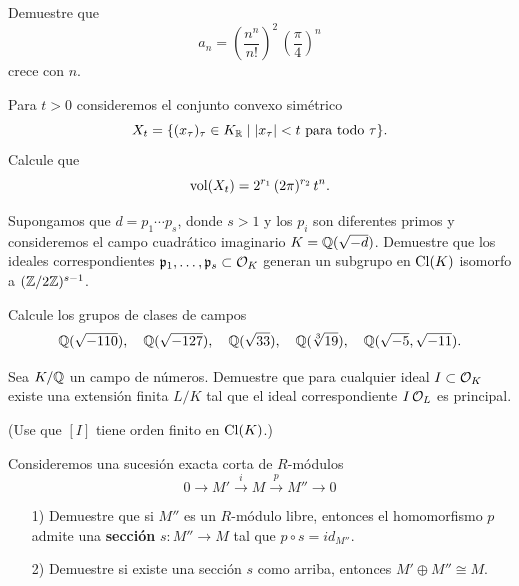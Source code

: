 \begin{ejercicio}
  Demuestre que
  $$a_n = \left(\frac{n^n}{n!}\right)^2\,\left(\frac{\pi}{4}\right)^n$$
  crece con $n$.
\end{ejercicio}

\begin{ejercicio}
  Para $t > 0$ consideremos el conjunto convexo simétrico
  $$X_t = \{ (x_\tau)_\tau \in K_{\mathbb{R}} \mid |x_\tau| < t\text{ para todo }\tau \}.$$
  Calcule que
  $$\operatorname{vol} (X_t) = 2^{r_1}\,(2\pi)^{r_2}\,t^n.$$
\end{ejercicio}

\begin{ejercicio}
  Supongamos que $d = p_1\cdots p_s$, donde $s > 1$ y los $p_i$ son diferentes
  primos y consideremos el campo cuadrático imaginario $K = \mathbb{Q} (\sqrt{-d})$.
  Demuestre que los ideales correspondientes
  $\mathfrak{p}_1,\ldots,\mathfrak{p}_s \subset \mathcal{O}_K$ generan un subgrupo en
  $\operatorname{Cl} (K)$ isomorfo a $(\mathbb{Z}/2\mathbb{Z})^{s-1}$.
\end{ejercicio}

\begin{ejercicio}
  Calcule los grupos de clases de campos
  \[ \mathbb{Q} (\sqrt{-110}), \quad
     \mathbb{Q} (\sqrt{-127}), \quad
     \mathbb{Q} (\sqrt{33}), \quad
     \mathbb{Q} (\sqrt[3]{19}), \quad
     \mathbb{Q} (\sqrt{-5}, \sqrt{-11}). \]
\end{ejercicio}

\begin{ejercicio}
  Sea $K/\mathbb{Q}$ un campo de números. Demuestre que para cualquier ideal
  $I \subset \mathcal{O}_K$ existe una extensión finita $L/K$ tal que el ideal
  correspondiente $I\,\mathcal{O}_L$ es principal.

  \noindent (Use que $[I]$ tiene orden finito en $\operatorname{Cl} (K)$.)
\end{ejercicio}

\begin{ejercicio}
  \label{ejerc:seccion-de-sec}
  Consideremos una sucesión exacta corta de $R$-módulos
  $$0 \to M' \xrightarrow{i} M \xrightarrow{p} M'' \to 0$$

  \begin{enumerate}
  \item[1)] Demuestre que si $M''$ es un $R$-módulo libre, entonces
    el homomorfismo $p$ admite una \textbf{sección} $s\colon M'' \to M$
    tal que $p\circ s = id_{M''}$.

  \item[2)] Demuestre si existe una sección $s$ como arriba, entonces
    $M'\oplus M'' \cong M$.
  \end{enumerate}
\end{ejercicio}


